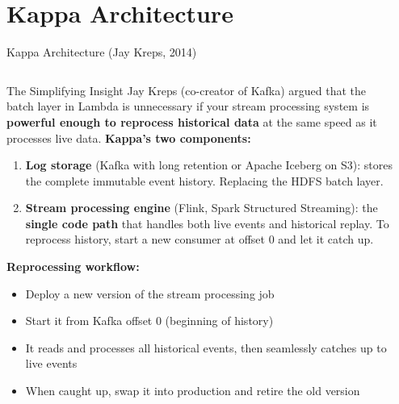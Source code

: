 \documentclass[aspectratio=169,10pt]{beamer}
\begin{document}
\section{Kappa Architecture}

\begin{frame}{Kappa Architecture (Jay Kreps, 2014)}
  \begin{columns}[T]
      \begin{block}{The Simplifying Insight}
        Jay Kreps (co-creator of Kafka) argued that the batch layer in Lambda is unnecessary if your stream processing system is \textbf{powerful enough to reprocess historical data} at the same speed as it processes live data.
        \vspace{4pt}
        \textbf{Kappa's two components:}
        \begin{enumerate}
          \item \textbf{Log storage} (Kafka with long retention or Apache Iceberg on S3): stores the complete immutable event history.  Replacing the HDFS batch layer.
          \item \textbf{Stream processing engine} (Flink, Spark Structured Streaming): the \textbf{single code path} that handles both live events and historical replay.  To reprocess history, start a new consumer at offset 0 and let it catch up.
        \end{enumerate}
        \vspace{4pt}
        \textbf{Reprocessing workflow:}
        \begin{itemize}
          \item Deploy a new version of the stream processing job
          \item Start it from Kafka offset 0 (beginning of history)
          \item It reads and processes all historical events, then seamlessly catches up to live events
          \item When caught up, swap it into production and retire the old version
        \end{itemize}
      \end{block}

      \begin{center}
\end{center}
\end{columns}
\end{frame}
\end{document}

